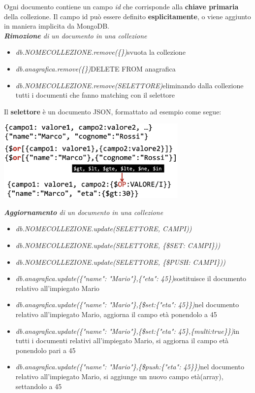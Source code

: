 \documentclass{article}
\begin{document}
Ogni documento contiene un campo \textit{\textunderscore id} che corrisponde alla \textbf{chiave primaria} della collezione. Il campo \textunderscore id può essere definito \textbf{esplicitamente}, o viene aggiunto in maniera implicita da MongoDB.\vspace{14pt}\\
\textit{\textbf{Rimozione} di un documento in una collezione}
\begin{itemize}[label={ }, leftmargin=1cm]
    \itemsep0em
    \item \textit{db.NOMECOLLEZIONE.remove(\{\})}\quad svuota la collezione
    \item \textit{db.anagrafica.remove(\{\})}\quad DELETE FROM anagrafica
    \item \textit{db.NOMECOLLEZIONE.remove(SELETTORE)}\quad eliminando dalla collezione tutti i documenti che fanno matching con il selettore
\end{itemize}
Il \textbf{selettore} è un documento JSON, formattato ad esempio come segue:
\begin{center}
    \includegraphics[width=0.7\textwidth]{foto 4.png}\vspace{14pt}\\
\end{center}
\textit{\textbf{Aggiornamento} di un documento in una collezione}
\begin{itemize}[label={ }, leftmargin=1cm]
    \itemsep0em
    \item \textit{db.NOMECOLLEZIONE.update(SELETTORE, CAMPI))}
    \item \textit{db.NOMECOLLEZIONE.update(SELETTORE, \{\$SET: CAMPI\}))}
    \item \textit{db.NOMECOLLEZIONE.update(SELETTORE, \{\$PUSH: CAMPI\}))}
    \item \textit{db.anagrafica.update(\{"name": "Mario"\},\{"eta": 45\})}\quad sostituisce il documento relativo all'impiegato Mario
    \item \textit{db.anagrafica.update(\{"name": "Mario"\},\{\$set:\{"eta": 45\}\})}\quad nel documento relativo all'impiegato Mario, aggiorna il campo età ponendolo a 45
    \item \textit{db.anagrafica.update(\{"name": "Mario"\},\{\$set:\{"eta": 45\},\{multi:true\}\})}\quad in tutti i documenti relativi all'impiegato Mario, si aggiorna il campo età ponendolo pari a 45
    \item \textit{db.anagrafica.update(\{"name": "Mario"\},\{\$push:\{"eta": 45\}\})}\quad nel documento relativo all'impiegato Mario, si aggiunge un nuovo campo età(array), settandolo a 45\\
\end{itemize}
\end{document}
